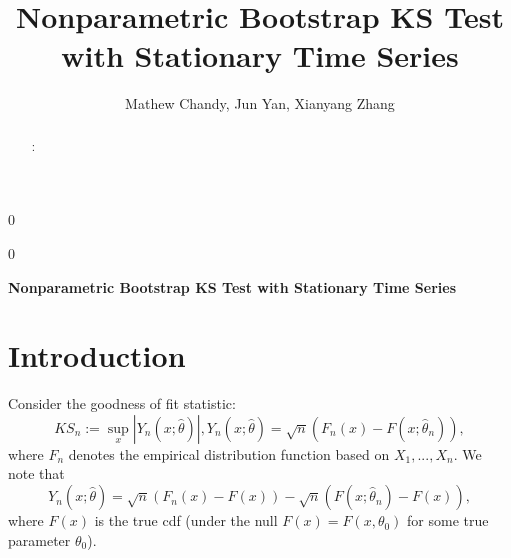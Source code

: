 \documentclass[12pt, letterpaper]{article}
\newcommand{\blind}{0}
\begin{document}

\blind
{
  \title{\bf Nonparametric Bootstrap KS Test with Stationary Time Series}
  \author{Mathew Chandy, %
  Jun Yan, %
  Xianyang Zhang\\
}
\date{}
  \maketitle
} \fi

\blind
{
  \bigskip
  \bigskip
  \bigskip
  \begin{center}
    {\LARGE\bf Nonparametric Bootstrap KS Test with Stationary Time Series}
\end{center}
  \bigskip
} \fi


\doublespace

\begin{abstract}


\bigskip
{}:
\end{abstract}


\section{Introduction}
\label{sec:intro}


Consider the goodness of fit statistic:
\begin{equation*}
KS_n := \sup_x|Y_n(x; \hat\theta)|, 
Y_n(x; \hat\theta) = \sqrt{n}(F_n(x) - F(x; \hat\theta_n)),
\end{equation*}
where $F_n$ denotes the empirical distribution function based on $X_1,...,X_n$.
We note that
\begin{equation*}
Y_n(x; \hat\theta) = \sqrt{n}(F_n(x) - F(x)) - 
\sqrt{n}(F(x; \hat\theta_n) - F(x)),
\end{equation*}
where $F(x)$ is the true cdf (under the null $F(x) = F(x, \theta_0)$ for some
true parameter $\theta_0$).
\end{document}
